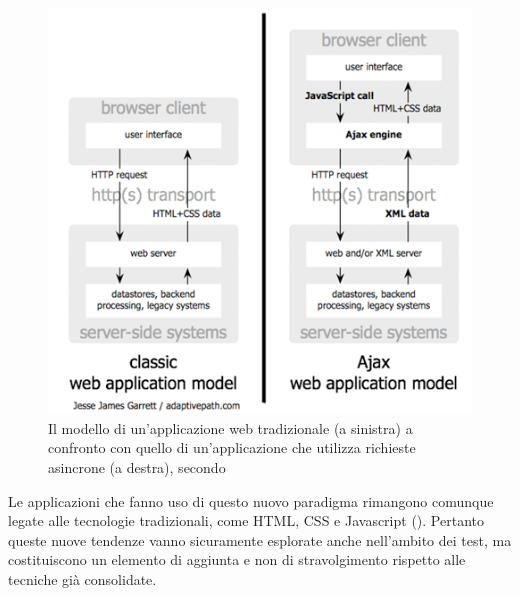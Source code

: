 \begin{figure}[htbp]
\begin{center}
\includegraphics{images/classic_vs_ajax.png}
\caption{Il modello di un'applicazione web tradizionale (a sinistra) a confronto con quello di un'applicazione che utilizza richieste asincrone (a destra), secondo \cite{ajaxGarrett} }
\label{default}
\end{center}
\end{figure}

Le applicazioni che fanno uso di questo nuovo paradigma rimangono comunque legate alle tecnologie tradizionali, come HTML, CSS e Javascript (\cite{ajaxGarrett}). Pertanto queste nuove tendenze vanno sicuramente esplorate anche nell'ambito dei test, ma costituiscono un elemento di aggiunta e non di stravolgimento rispetto alle tecniche già consolidate.

 

